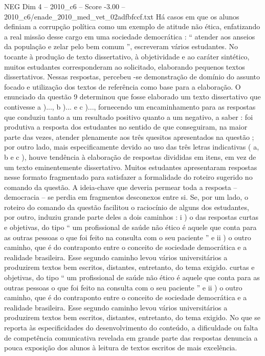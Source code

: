 \begin{textsample}{NEG Dim 4 – 2010\_c6 – Score -3.00 – 2010\_c6/enade\_2010\_med\_vet\_02adfbfccf.txt}
Há casos em que os alunos definiam a corrupção política como um exemplo de atitude não ética, enfatizando a real missão desse cargo em uma sociedade democrática : “ atender aos anseios da população e zelar pelo bem comum ”, escreveram vários estudantes.
No tocante à produção de texto dissertativo, à objetividade e ao caráter sintético, muitos estudantes corresponderam ao solicitado, elaborando pequenos textos dissertativos.
Nessas respostas, percebeu -se demonstração de domínio do assunto focado e utilização dos textos de referência como base para a elaboração.
O enunciado da questão 9 determinou que fosse elaborado um texto dissertativo que contivesse a )..., b )... e c )..., fornecendo um encaminhamento para as respostas que conduziu tanto a um resultado positivo quanto a um negativo, a saber : foi produtiva a resposta dos estudantes no sentido de que conseguiram, na maior parte das vezes, atender plenamente aos três quesitos apresentados na questão ; por outro lado, mais especificamente devido ao uso das três letras indicativas ( a, b e c ), houve tendência à elaboração de respostas divididas em itens, em vez de um texto eminentemente dissertativo.
Muitos estudantes apresentaram respostas nesse formato fragmentado para satisfazer a formalidade do roteiro sugerido no comando da questão.
A ideia-chave que deveria permear toda a resposta – democracia – se perdia em fragmentos desconexos entre si.
Se, por um lado, o roteiro do comando da questão facilitou o raciocínio de alguns dos estudantes, por outro, induziu grande parte deles a dois caminhos : i ) o das respostas curtas e objetivas, do tipo “ um profissional de saúde não ético é aquele que conta para as outras pessoas o que foi feito na consulta com o seu paciente ” e ii ) o outro caminho, que é do contraponto entre o conceito de sociedade democrática e a realidade brasileira.
Esse segundo caminho levou vários universitários a produzirem textos bem escritos, distantes, entretanto, do tema exigido. curtas e objetivas, do tipo “ um profissional de saúde não ético é aquele que conta para as outras pessoas o que foi feito na consulta com o seu paciente ” e ii ) o outro caminho, que é do contraponto entre o conceito de sociedade democrática e a realidade brasileira.
Esse segundo caminho levou vários universitários a produzirem textos bem escritos, distantes, entretanto, do tema exigido.
No que se reporta às especificidades do desenvolvimento do conteúdo, a dificuldade ou falta de competência comunicativa revelada em grande parte das respostas denuncia a pouca exposição dos alunos à leitura de textos escritos de mais excelência.

\end{textsample}

